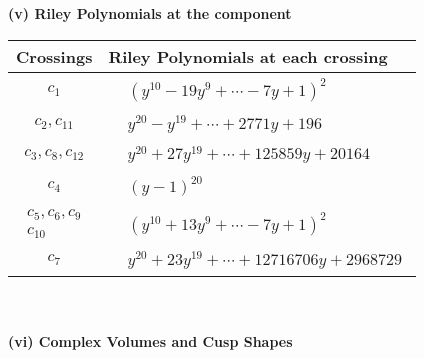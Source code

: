 \documentclass[1p]{elsarticle_modified}
\theoremstyle{definition}
\begin{document}
\newpage\renewcommand{\arraystretch}{1}
\flushleft \textbf{(v) Riley Polynomials at the component}\newline \\
\begin{tabular}{m{50pt}|m{274pt}}
Crossings & \hspace{64pt}Riley Polynomials at each crossing \\
\hline $$\begin{aligned}c_{1}\end{aligned}$$&$\begin{aligned}
&(y^{10}-19 y^9+\cdots-7 y+1)^{2}
\end{aligned}$\\
\hline $$\begin{aligned}c_{2},c_{11}\end{aligned}$$&$\begin{aligned}
&y^{20}- y^{19}+\cdots+2771 y+196
\end{aligned}$\\
\hline $$\begin{aligned}c_{3},c_{8},c_{12}\end{aligned}$$&$\begin{aligned}
&y^{20}+27 y^{19}+\cdots+125859 y+20164
\end{aligned}$\\
\hline $$\begin{aligned}c_{4}\end{aligned}$$&$\begin{aligned}
&(y-1)^{20}
\end{aligned}$\\
\hline $$\begin{aligned}c_{5},c_{6},c_{9}\\c_{10}\end{aligned}$$&$\begin{aligned}
&(y^{10}+13 y^9+\cdots-7 y+1)^{2}
\end{aligned}$\\
\hline $$\begin{aligned}c_{7}\end{aligned}$$&$\begin{aligned}
&y^{20}+23 y^{19}+\cdots+12716706 y+2968729
\end{aligned}$\\
\hline
\end{tabular}\\~\\
\newpage\flushleft \textbf{(vi) Complex Volumes and Cusp Shapes}
\end{document}
